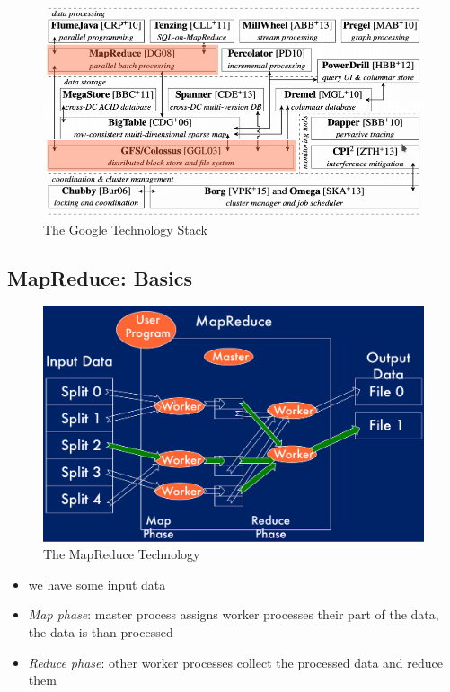 \documentclass[a4paper]{article}
\begin{document}
\begin{multicols}{3}
\begin{figure}[H]
    \includegraphics[width=\linewidth]{GoogleTechnologyStack.png}
    \caption{The Google Technology Stack}
    \label{fig:googlestack}
\end{figure}

\subsection{MapReduce: Basics}
\begin{figure}[H]
    \includegraphics[width=\linewidth]{MapReduce.png}
    \caption{The MapReduce Technology}
    \label{fig:mapreduce}
\end{figure}

\begin{itemize}
    \item we have some input data
    \item \textit{Map phase}: master process assigns worker processes their part of the data, the data is than processed 
    \item \textit{Reduce phase}: other worker processes collect the processed data and reduce them
\end{itemize}


\end{multicols}
\end{document}
